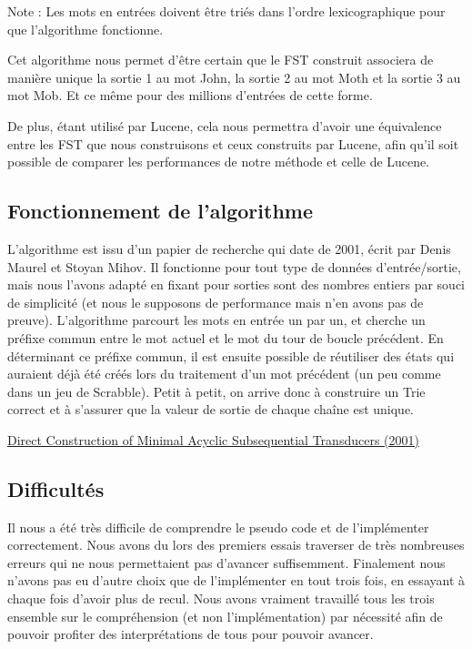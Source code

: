 Note : Les mots en entrées doivent être triés dans l'ordre lexicographique pour
que l'algorithme fonctionne.

Cet algorithme nous permet d'être certain que le FST construit associera de manière unique la sortie 1 au mot John, la sortie 2 au mot Moth et la sortie 3 au mot Mob. Et ce même pour des millions d'entrées de cette forme.

De plus, étant utilisé par Lucene, cela nous permettra d'avoir une équivalence entre les FST que nous construisons et ceux construits par Lucene, afin qu'il soit possible de comparer les performances de notre méthode et celle de Lucene.

\subsection{Fonctionnement de l'algorithme}

L'algorithme est issu d'un papier de recherche qui date de 2001, écrit par Denis Maurel et Stoyan Mihov.
Il fonctionne pour tout type de données d'entrée/sortie, mais nous l'avons adapté en fixant pour sorties sont des nombres entiers par souci de simplicité (et nous le supposons de performance mais n'en avons pas de preuve).
L'algorithme parcourt les mots en entrée un par un, et cherche un préfixe commun entre le mot actuel et le mot du tour de boucle précédent. En déterminant ce préfixe commun, il est ensuite possible de réutiliser des états qui auraient déjà été créés lors du traitement d'un mot précédent (un peu comme dans un jeu de Scrabble). Petit à petit, on arrive donc à construire un Trie correct et à s'assurer que la valeur de sortie de chaque chaîne est unique.


\href{http://citeseerx.ist.psu.edu/viewdoc/summary?doi=10.1.1.24.3698}{Direct Construction of Minimal Acyclic Subsequential Transducers (2001)}

\subsection{Difficultés}

Il nous a été très difficile de comprendre le pseudo code et de l'implémenter correctement.
Nous avons du lors des premiers essais traverser de très nombreuses erreurs qui
ne nous permettaient pas d'avancer suffisemment. Finalement nous n'avons pas eu d'autre
choix que de l'implémenter en tout trois fois, en essayant à chaque fois d'avoir plus
de recul. Nous avons vraiment travaillé tous les trois ensemble sur le compréhension
(et non l'implémentation) par nécessité afin de pouvoir profiter des interprétations
de tous pour pouvoir avancer.


